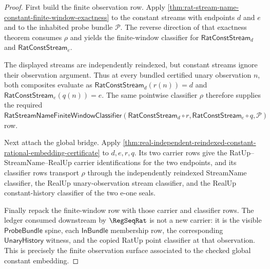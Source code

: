 \begin{proof}
First build the finite observation row. Apply
\autoref{thm:rat-stream-name-constant-finite-window-exactness} to the constant
streams with endpoints $d$ and $e$ and to the inhabited probe bundle
$\mathcal{P}$. The reverse direction of that exactness theorem consumes
$\rho$ and yields the finite-window classifier for
$\mathsf{RatConstStream}_d$ and $\mathsf{RatConstStream}_e$.

The displayed streams are independently reindexed, but constant streams ignore
their observation argument. Thus at every bundled certified unary observation
$n$, both composites evaluate as
$\mathsf{RatConstStream}_d(r(n))=d$ and
$\mathsf{RatConstStream}_e(q(n))=e$. The same pointwise classifier $\rho$
therefore supplies the required
$\mathsf{RatStreamNameFiniteWindowClassifier}
(\mathsf{RatConstStream}_d\circ r,
\mathsf{RatConstStream}_e\circ q,\mathcal{P})$ row.

Next attach the global bridge. Apply
\autoref{thm:real-independent-reindexed-constant-rational-embedding-certificate}
to $d,e,r,q$. Its two carrier rows give the RatUp--StreamName--RealUp carrier
identifications for the two endpoints, and its classifier rows transport
$\rho$ through the independently reindexed StreamName classifier, the RealUp
unary-observation stream classifier, and the RealUp constant-history classifier
of the two e-one seals.

Finally repack the finite-window row with those carrier and classifier rows.
The ledger consumed downstream by $\RegSeqRat$ is not a new carrier: it is the
visible $\mathsf{ProbeBundle}$ spine, each $\mathsf{InBundle}$ membership row,
the corresponding $\mathsf{UnaryHistory}$ witness, and the copied RatUp point
classifier at that observation. This is precisely the finite observation
surface associated to the checked global constant embedding.
\end{proof}

